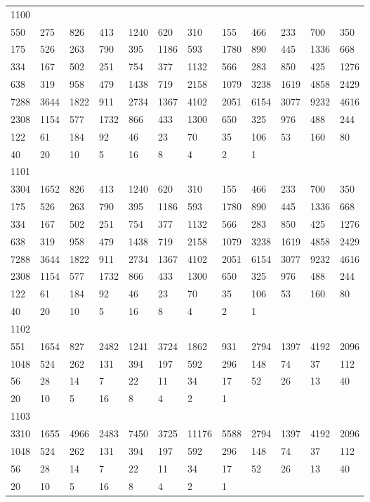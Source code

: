 \begin{longtable}{llllllllllll}
1100&&&&&&&&&&&\\
550& 275& 826& 413& 1240& 620& 310& 155& 466& 233& 700& 350\\
175& 526& 263& 790& 395& 1186& 593& 1780& 890& 445& 1336& 668\\
334& 167& 502& 251& 754& 377& 1132& 566& 283& 850& 425& 1276\\
638& 319& 958& 479& 1438& 719& 2158& 1079& 3238& 1619& 4858& 2429\\
7288& 3644& 1822& 911& 2734& 1367& 4102& 2051& 6154& 3077& 9232& 4616\\
2308& 1154& 577& 1732& 866& 433& 1300& 650& 325& 976& 488& 244\\
122& 61& 184& 92& 46& 23& 70& 35& 106& 53& 160& 80\\
40& 20& 10& 5& 16& 8& 4& 2& 1& \\

1101&&&&&&&&&&&\\
3304& 1652& 826& 413& 1240& 620& 310& 155& 466& 233& 700& 350\\
175& 526& 263& 790& 395& 1186& 593& 1780& 890& 445& 1336& 668\\
334& 167& 502& 251& 754& 377& 1132& 566& 283& 850& 425& 1276\\
638& 319& 958& 479& 1438& 719& 2158& 1079& 3238& 1619& 4858& 2429\\
7288& 3644& 1822& 911& 2734& 1367& 4102& 2051& 6154& 3077& 9232& 4616\\
2308& 1154& 577& 1732& 866& 433& 1300& 650& 325& 976& 488& 244\\
122& 61& 184& 92& 46& 23& 70& 35& 106& 53& 160& 80\\
40& 20& 10& 5& 16& 8& 4& 2& 1& \\

1102&&&&&&&&&&&\\
551& 1654& 827& 2482& 1241& 3724& 1862& 931& 2794& 1397& 4192& 2096\\
1048& 524& 262& 131& 394& 197& 592& 296& 148& 74& 37& 112\\
56& 28& 14& 7& 22& 11& 34& 17& 52& 26& 13& 40\\
20& 10& 5& 16& 8& 4& 2& 1& \\

1103&&&&&&&&&&&\\
3310& 1655& 4966& 2483& 7450& 3725& 11176& 5588& 2794& 1397& 4192& 2096\\
1048& 524& 262& 131& 394& 197& 592& 296& 148& 74& 37& 112\\
56& 28& 14& 7& 22& 11& 34& 17& 52& 26& 13& 40\\
20& 10& 5& 16& 8& 4& 2& 1& \\


\end{longtable}
